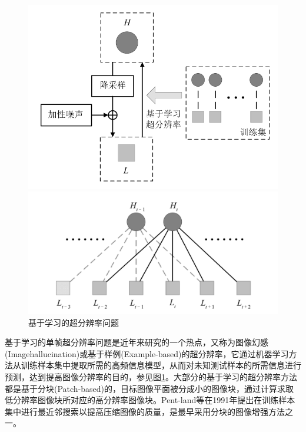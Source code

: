\documentclass[]{article}
\begin{document}
    \begin{figure}[htbp]
        \centering
        \begin{minipage}[t]{0.4\textwidth}
            \centering
            \includegraphics[width=\textwidth]{img/fig-3.png}
        \end{minipage}
        \begin{minipage}[t]{0.4\textwidth}
            \centering
            \includegraphics[width=\textwidth]{img/fig-4.png}
        \end{minipage}
        \caption{基于学习的超分辨率问题}
        \label{fig3}
    \end{figure}

    基于学习的单帧超分辨率问题是近年来研究的一个热点，又称为图像幻感(Imagehallucination)或基于样例(Example-based)的超分辨率，它通过机器学习方法从训练样本集中提取所需的高频信息模型，从而对未知测试样本的所需信息进行预测，达到提高图像分辨率的目的，参见图\ref{fig3}。大部分的基于学习的超分辨率方法都是基于分块(Patch-based)的，目标图像平面被分成小的图像块，通过计算求取低分辨率图像块所对应的高分辨率图像块。Pent-land等在1991年提出在训练样本集中进行最近邻搜索以提高压缩图像的质量，是最早采用分块的图像增强方法之一。\\
    
\end{document}
